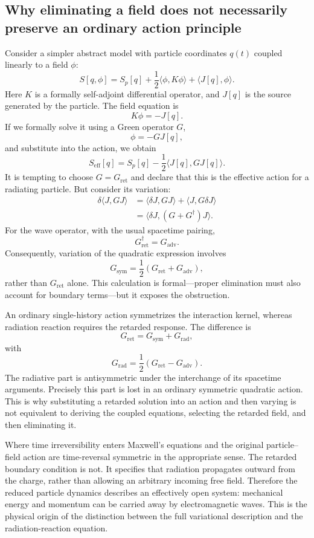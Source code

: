 \subsection{Why eliminating a field does not necessarily preserve an ordinary
action principle}
Consider a simpler abstract model with particle coordinates \(q(t)\) coupled
linearly to a field \(\phi\):
\[
S[q,\phi]
=
S_p[q]
+\frac12\langle\phi,K\phi\rangle
+\langle J[q],\phi\rangle.
\]
Here \(K\) is a formally self-adjoint differential operator, and \(J[q]\) is
the source generated by the particle.
The field equation is
\[
K\phi=-J[q].
\]
If we formally solve it using a Green operator \(G\),
\[
\phi=-GJ[q],
\]
and substitute into the action, we obtain
\[
S_{\mathrm{eff}}[q]
=
S_p[q]
-\frac12\langle J[q],GJ[q]\rangle.
\]
It is tempting to choose \(G=G_{\mathrm{ret}}\) and declare that this is the
effective action for a radiating particle.
But consider its variation:
\[
\begin{aligned}
\delta\langle J,GJ\rangle
&=\langle\delta J,GJ\rangle
+\langle J,G\delta J\rangle\\
&=\langle\delta J,(G+G^\dagger)J\rangle.
\end{aligned}
\]
For the wave operator, with the usual spacetime pairing,
\[
G_{\mathrm{ret}}^\dagger=G_{\mathrm{adv}}.
\]
Consequently, variation of the quadratic expression involves
\[
\boxed{
G_{\mathrm{sym}}
=
\frac12(G_{\mathrm{ret}}+G_{\mathrm{adv}}),
}
\]
rather than \(G_{\mathrm{ret}}\) alone.
This calculation is formal—proper elimination must also account for boundary
terms—but it exposes the obstruction.

An ordinary single-history action symmetrizes the interaction kernel, whereas
radiation reaction requires the retarded response.
The difference is
\[
G_{\mathrm{ret}}
=
G_{\mathrm{sym}}+G_{\mathrm{rad}},
\]
with
\[
G_{\mathrm{rad}}
=
\frac12(G_{\mathrm{ret}}-G_{\mathrm{adv}}).
\]
The radiative part is antisymmetric under the interchange of its spacetime
arguments. Precisely this part is lost in an ordinary symmetric quadratic
action.
This is why substituting a retarded solution into an action and then varying is
not equivalent to deriving the coupled equations, selecting the retarded field,
and then eliminating it.

Where time irreversibility enters
Maxwell's equations and the original particle–field action are time-reversal
symmetric in the appropriate sense.
The retarded boundary condition is not.
It specifies that radiation propagates outward from the charge, rather than
allowing an arbitrary incoming free field.
Therefore the reduced particle dynamics describes an effectively open system:
mechanical energy and momentum can be carried away by electromagnetic waves.
This is the physical origin of the distinction between the full variational
description and the radiation-reaction equation.

